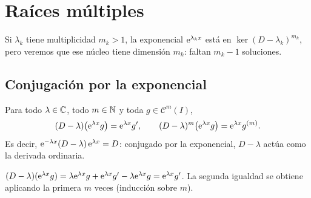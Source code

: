 \documentclass[11pt,twoside]{article}
\newcommand\Cl{\mathcal C}
\begin{document}
\section{Raíces múltiples}\label{sec:multiples}

Si $\lambda_k$ tiene multiplicidad $m_k>1$, la exponencial $\mathrm{e}^{\lambda_kx}$ está en $\ker(D-\lambda_k)^{m_k}$, pero veremos
que ese núcleo tiene dimensión $m_k$: faltan $m_k-1$ soluciones.

\subsection{Conjugación por la exponencial}

\begin{lema}\label{lem:covariante}
Para todo $\lambda\in\mathbb{C}$, todo $m\in\mathbb{N}$ y toda $g\in\Cl^m(I)$,
\begin{equation}\label{eq:covariante}
(D-\lambda)\big(\mathrm{e}^{\lambda x}g\big)=\mathrm{e}^{\lambda x}g',\qquad(D-\lambda)^m\big(\mathrm{e}^{\lambda x}g\big)=\mathrm{e}^{\lambda x}g^{(m)}.
\end{equation}
Es decir, $\mathrm{e}^{-\lambda x}(D-\lambda)\,\mathrm{e}^{\lambda x}=D$: conjugado por la exponencial, $D-\lambda$ actúa como la derivada ordinaria.
\end{lema}

\begin{demostracion}
$(D-\lambda)(\mathrm{e}^{\lambda x}g)=\lambda\mathrm{e}^{\lambda x}g+\mathrm{e}^{\lambda x}g'-\lambda\mathrm{e}^{\lambda x}g=\mathrm{e}^{\lambda x}g'$. La segunda igualdad
se obtiene aplicando la primera $m$ veces (inducción sobre $m$).
\end{demostracion}
\end{document}

